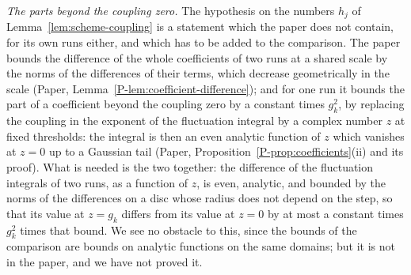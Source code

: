 \documentclass[11pt]{preprint}
\numberwithin{equation}{section}
\theoremstyle{definition}
\theoremstyle{remark}
\theoremstyle{plain}
\begin{document}
\emph{The parts beyond the coupling zero.} The hypothesis on the numbers $h_j$ of Lemma~\ref{lem:scheme-coupling} is a statement which the paper does not contain, for its own runs either, and which has to be added to the comparison. The paper bounds the difference of the whole coefficients of two runs at a shared scale by the norms of the differences of their terms, which decrease geometrically in the scale (Paper, Lemma~\ref{P-lem:coefficient-difference}); and for one run it bounds the part of a coefficient beyond the coupling zero by a constant times $g_k^2$, by replacing the coupling in the exponent of the fluctuation integral by a complex number $z$ at fixed thresholds: the integral is then an even analytic function of $z$ which vanishes at $z = 0$ up to a Gaussian tail (Paper, Proposition~\ref{P-prop:coefficients}(ii) and its proof). What is needed is the two together: the difference of the fluctuation integrals of two runs, as a function of $z$, is even, analytic, and bounded by the norms of the differences on a disc whose radius does not depend on the step, so that its value at $z = g_k$ differs from its value at $z = 0$ by at most a constant times $g_k^2$ times that bound. We see no obstacle to this, since the bounds of the comparison are bounds on analytic functions on the same domains; but it is not in the paper, and we have not proved it.
\end{document}
